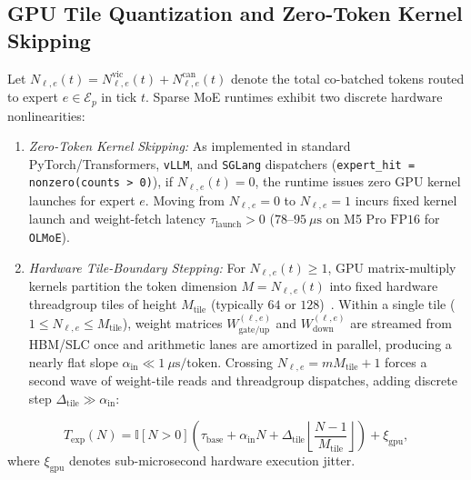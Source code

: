 \documentclass[10pt,journal,compsoc]{IEEEtran}
\theoremstyle{definition}
\theoremstyle{remark}
\begin{document}
\subsection{GPU Tile Quantization and Zero-Token Kernel Skipping}
Let $N_{\ell, e}(t) = N_{\ell, e}^{\mathrm{vic}}(t) + N_{\ell, e}^{\mathrm{can}}(t)$ denote the total co-batched tokens routed to expert $e \in \mathcal{E}_p$ in tick $t$. Sparse MoE runtimes exhibit two discrete hardware nonlinearities:
\begin{enumerate}
  \item \emph{Zero-Token Kernel Skipping:} As implemented in standard PyTorch/Transformers, \texttt{vLLM}, and \texttt{SGLang} dispatchers (\texttt{expert\_hit = nonzero(counts > 0)}), if $N_{\ell, e}(t) = 0$, the runtime issues zero GPU kernel launches for expert $e$. Moving from $N_{\ell, e} = 0$ to $N_{\ell, e} = 1$ incurs fixed kernel launch and weight-fetch latency $\tau_{\mathrm{launch}} > 0$ ($78$--$95~\mu\mathrm{s}$ on M5 Pro $\mathrm{FP16}$ for \texttt{OLMoE}).
  \item \emph{Hardware Tile-Boundary Stepping:} For $N_{\ell, e}(t) \ge 1$, GPU matrix-multiply kernels partition the token dimension $M = N_{\ell, e}(t)$ into fixed hardware threadgroup tiles of height $M_{\mathrm{tile}}$ (typically $64$ or $128$)~\cite{tan2025gpugemmcliff}. Within a single tile ($1 \le N_{\ell, e} \le M_{\mathrm{tile}}$), weight matrices $W_{\mathrm{gate/up}}^{(\ell, e)}$ and $W_{\mathrm{down}}^{(\ell, e)}$ are streamed from HBM/SLC once and arithmetic lanes are amortized in parallel, producing a nearly flat slope $\alpha_{\mathrm{in}} \ll 1~\mu\mathrm{s}/\text{token}$. Crossing $N_{\ell, e} = m M_{\mathrm{tile}} + 1$ forces a second wave of weight-tile reads and threadgroup dispatches, adding discrete step $\Delta_{\mathrm{tile}} \gg \alpha_{\mathrm{in}}$:
\end{enumerate}
\begin{equation}\label{eq:piecewise_latency}
  T_{\mathrm{exp}}(N) = \mathbb{I}[N > 0] \left( \tau_{\mathrm{base}} + \alpha_{\mathrm{in}} N + \Delta_{\mathrm{tile}} \left\lfloor \frac{N - 1}{M_{\mathrm{tile}}} \right\rfloor \right) + \xi_{\mathrm{gpu}},
\end{equation}
where $\xi_{\mathrm{gpu}}$ denotes sub-microsecond hardware execution jitter.
\end{document}
